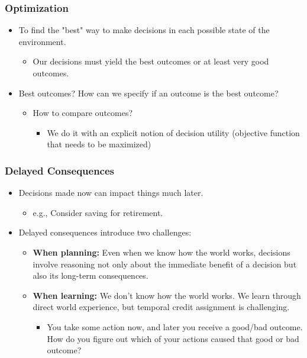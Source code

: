 \subsubsection{Optimization}
\begin{summary}
    \begin{itemize}
        \item To find the "best" way to make decisions in each possible state of the environment.
        \begin{itemize}
            \item Our decisions must yield the best outcomes or at least very good outcomes.
        \end{itemize}
        \item Best outcomes? How can we specify if an outcome is the best outcome?
        \begin{itemize}
            \item How to compare outcomes?
            \begin{itemize}
                \item We do it with an explicit notion of decision utility (objective function that needs to be maximized)
            \end{itemize}
        \end{itemize}
    \end{itemize}
\end{summary}

\subsubsection{Delayed Consequences}
\begin{summary}
    \begin{itemize}
        \item Decisions made now can impact things much later.
        \begin{itemize}
            \item e.g., Consider saving for retirement.
        \end{itemize}
        \item Delayed consequences introduce two challenges:
        \begin{itemize}
            \item \textbf{When planning:} Even when we know how the world works, decisions involve reasoning not only about the immediate benefit of a decision but also its long-term consequences.
            \item \textbf{When learning:} We don't know how the world works. We learn through direct world experience, but temporal credit assignment is challenging.
            \begin{itemize}
                \item You take some action now, and later you receive a good/bad outcome. How do you figure out which of your actions caused that good or bad outcome?
            \end{itemize}
        \end{itemize}
    \end{itemize}
\end{summary}

